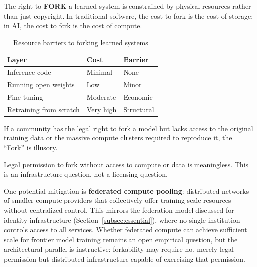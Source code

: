The right to \textbf{FORK} a learned system is constrained by physical resources rather than just copyright. In traditional software, the cost to fork is the cost of storage; in AI, the cost to fork is the cost of compute.

\begin{table}[htbp]
\centering
\begin{tabular}{@{}lll@{}}
\toprule
\textbf{Layer} & \textbf{Cost} & \textbf{Barrier} \\
\midrule
Inference code & Minimal & None \\
Running open weights & Low & Minor \\
Fine-tuning & Moderate & Economic \\
Retraining from scratch & Very high & Structural \\
\bottomrule
\end{tabular}
\caption{Resource barriers to forking learned systems}
\end{table}

If a community has the legal right to fork a model but lacks access to the original training data or the massive compute clusters required to reproduce it, the ``Fork'' is illusory.

\begin{claim}
Legal permission to fork without access to compute or data is meaningless. This is an infrastructure question, not a licensing question.
\end{claim}

One potential mitigation is \textbf{federated compute pooling}: distributed networks of smaller compute providers that collectively offer training-scale resources without centralized control. This mirrors the federation model discussed for identity infrastructure (Section~\ref{subsec:essential}), where no single institution controls access to all services. Whether federated compute can achieve sufficient scale for frontier model training remains an open empirical question, but the architectural parallel is instructive: forkability may require not merely legal permission but distributed infrastructure capable of exercising that permission.